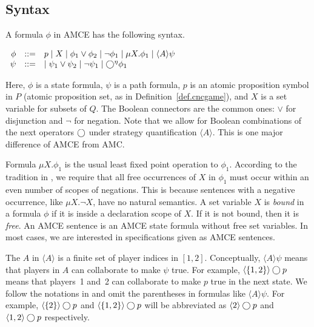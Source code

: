 \subsection{Syntax}
A formula $\phi$ in AMCE has the following syntax. 
\begin{center} 
$\begin{array}{rrl} 
\phi	& ::= & p 
	\mid X 
	\mid \phi_1 \vee \phi_2
	\mid \neg \phi_1 
 	\mid \mu X.\phi_1 
 	\mid \langle A\rangle \psi\\ 
\psi	& ::= &
	\mid \psi_1 \vee \psi_2
	\mid \neg \psi_1 
 	\mid \bigcirc^\eta \phi_1
\end{array}$ 
\end{center} 
Here, $\phi$ is a state formula, $\psi$ is a path formula,  
$p$ is an atomic proposition symbol in $P$ 
(atomic proposition set, as in Definition~\ref{def.cncgame})\label{reply1.P.x}, 
and 
$X$ is a set variable for subsets of $Q$.
The Boolean connectors are the common ones: $\vee$ for disjunction and 
$\neg$ for negation.
Note that we allow for Boolean combinations of the next operators $\bigcirc$ 
under strategy quantification  $\langle A\rangle$.  
This is one major difference of AMCE from AMC.  

Formula $\mu X.\phi_1$ is the usual least fixed point operation to $\phi_1$.
According to the tradition in \cite{AHK02}, 
we require that all free occurrences of $X$ in $\phi_1$ must occur
within an even number of scopes of negations.    
This is because sentences with a negative occurrence, like $\mu X. \neg X$, have no natural semantics.
A set variable $X$ is {\em bound} in a formula $\phi$ if it is inside a declaration scope of $X$.  
If it is not bound, then it is {\em free}.  
An AMCE sentence is an AMCE state formula without free set variables. 
In most cases, we are interested in specifications given as AMCE sentences.  


The $A$ in $\langle A \rangle$ is a finite set of player indices 
in $[1,2]$.
Conceptually, $\langle A \rangle\psi$ means that players in $A$ can collaborate 
to make $\psi$ true. 
For example, $\langle \{1,2\}\rangle\bigcirc p$ means that 
players~1 and~2 can collaborate to make $p$ true in the next state. 
We follow the notations in \cite{AHK02} and omit the parentheses in 
formulas like $\langle A\rangle \psi$.  
For example, $\langle \{2\}\rangle \bigcirc p$ 
and $\langle \{1,2\}\rangle \bigcirc p$ 
will be abbreviated as 
$\langle 2\rangle \bigcirc p$ and   
$\langle 1,2\rangle \bigcirc p$ respectively.  

